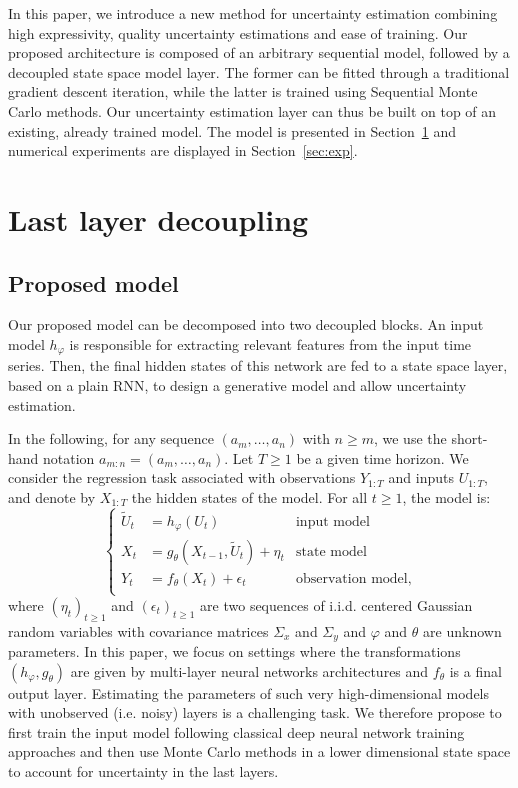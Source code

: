 \documentclass{article}
\begin{document}
In this paper, we introduce a new method for uncertainty estimation combining high expressivity, quality uncertainty estimations and ease of training.
Our proposed architecture is composed of an arbitrary sequential model, followed by a decoupled state space model layer.
The former can be fitted through a traditional gradient descent iteration, while the latter is trained using Sequential Monte Carlo methods.
Our uncertainty estimation layer can thus be built on top of an existing, already trained model. The model is presented in Section~\ref{sec:decoupling} and numerical experiments are displayed in Section~\ref{sec:exp}.

\section{Last layer decoupling}
\label{sec:decoupling}

\subsection{Proposed model}%
\label{sub:proposed_architecture}

Our proposed model can be decomposed into two decoupled blocks.
An input model $h_\varphi$ is responsible for extracting relevant features from the input time series. Then, the final hidden states of this network are fed to a state space layer, based on a plain RNN, to design a generative model and allow uncertainty estimation.

In the following, for any sequence $(a_m,\ldots, a_n)$ with $n\geq m$, we use the short-hand notation $a_{m:n} = (a_m,\ldots, a_n)$. Let $T\ge 1$ be a given time horizon. We consider the regression task associated with observations $Y_{1:T}$ and inputs $U_{1:T}$, and denote by $X_{1:T}$ the hidden states of the model. For all $t\geq 1$, the model is:
\begin{equation*}
	\left\{
	\begin{aligned}
		\widetilde U_t & = h_\varphi(U_t)                             & \text{input model}        \\
		X_t            & = g_\theta(X_{t-1}, \widetilde U_t) + \eta_t & \text{state model}        \\
		Y_t            & = f_\theta(X_t) + \epsilon_t                 & \text{observation model,} \\
	\end{aligned}
	\right.
\end{equation*}
where $(\eta_t)_{t\geq 1}$ and $(\epsilon_t)_{t\geq 1}$ are two sequences of i.i.d. centered Gaussian random variables with covariance matrices $\Sigma_x$ and $\Sigma_y$ and $\varphi$ and $\theta$ are unknown parameters. In this paper, we focus on settings where the transformations $(h_\varphi,g_\theta)$ are given by multi-layer neural networks architectures and $f_\theta$ is a final output layer. Estimating the parameters of such very high-dimensional models with unobserved (i.e. noisy) layers is a challenging task. We therefore propose to first train the input model following classical deep neural network training approaches and then use Monte Carlo methods in a lower dimensional state space to account for uncertainty in the last layers.
\end{document}
